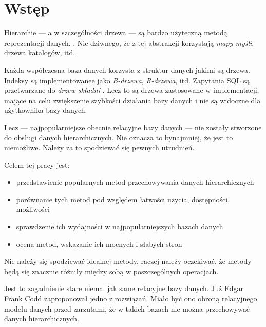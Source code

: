 \chapter*{Wstęp}






Hierarchie --- a w szczególności drzewa --- są bardzo użyteczną metodą reprezentacji danych. . 
Nic dziwnego, że z tej abstrakcji korzystają \emph{mapy myśli}, drzewa katalogów, itd.






Każda współczesna baza danych korzysta z struktur danych jakimi są drzewa. 
Indeksy są implementowanee jako \emph{B-drzewa}, \emph{R-drzewa}, itd.
Zapytania SQL są przetwarzane do \emph{drzew składni} .
Lecz to są drzewa zastosowane w implementacji, mające na celu zwiększenie szybkości działania bazy danych i nie są widoczne dla użytkownika bazy danych.

Lecz --- najpopularniejsze obecnie relacyjne bazy danych --- nie zostały stworzone do obsługi danych hierarchicznych.
Nie oznacza to bynajmniej, że jest to niemożliwe.
Należy za to spodziewać się pewnych utrudnień.






Celem tej pracy jest:
\begin{itemize}
    \item przedstawienie popularnych metod przechowywania danych hierarchicznych
    \item porównanie tych metod pod względem łatwości użycia, dostępności, możliwości
    \item sprawdzenie ich wydajności w najpopularniejszych bazach danych
    \item ocena metod, wskazanie ich mocnych i słabych stron
\end{itemize}

Nie należy się spodziewać idealnej metody, raczej należy oczekiwać, że metody będą się znacznie różniły między sobą w poszczególnych operacjach.


Jest to zagadnienie stare niemal jak same relacyjne bazy danych. 
Już Edgar Frank Codd zaproponował jedno z rozwiązań.
Miało być ono obroną relacyjnego modelu danych przed zarzutami, 
że w takich bazach nie można przechowywać danych hierarchicznych.



